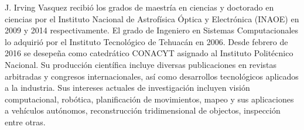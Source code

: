 J. Irving Vasquez recibió los grados de maestría en ciencias y doctorado en ciencias por el Instituto Nacional de Astrofísica Óptica y Electrónica (INAOE) en 2009 y 2014 respectivamente. El grado de Ingeniero en Sistemas Computacionales lo adquirió por el Instituto Tecnológico de Tehuacán en 2006. Desde febrero de 2016 se desepeña como catedrático CONACYT asignado al Instituto Politécnico Nacional. Su producción científica incluye diversas publicaciones en revistas arbitradas y congresos internacionales, así como desarrollos tecnológicos aplicados a la industria. Sus intereses actuales de investigación incluyen visión computacional, robótica, planificación de movimientos, mapeo y sus aplicaciones a vehículos autónomos, reconstrucción tridimensional de objectos, inspección entre otras.